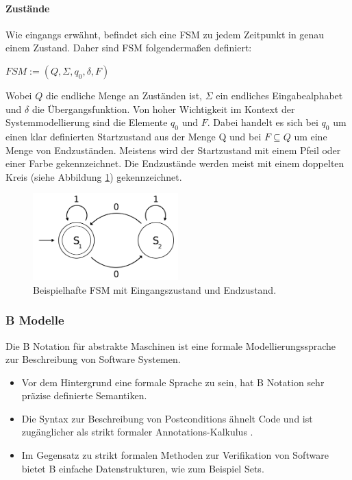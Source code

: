 \paragraph{Zustände}
Wie eingangs erwähnt, befindet sich eine \Gls{FSM} zu jedem Zeitpunkt in genau einem Zustand. Daher sind \Gls{FSM} folgendermaßen definiert: 

\begin{center}
$FSM := (Q, \Sigma, q_0, \delta, F)$
\end{center}

Wobei $Q$ die endliche Menge an Zuständen ist, $\Sigma$ ein endliches Eingabealphabet und $\delta$ die Übergangsfunktion. Von hoher Wichtigkeit im Kontext der Systemmodellierung sind die Elemente $q_0$ und $F$. Dabei handelt es sich bei $q_0$ um einen klar definierten Startzustand aus der Menge Q und bei $F \subseteq Q$ um eine Menge von Endzuständen. Meistens wird der Startzustand mit einem Pfeil oder einer Farbe gekennzeichnet. Die Endzustände werden meist mit einem doppelten Kreis (siehe Abbildung \ref{fig:fsm_example}) gekennzeichnet.

\begin{figure}[h] 
  \centering
     \includegraphics[width=0.5\textwidth]{figures/FSM_example.png}
  \caption{Beispielhafte FSM mit Eingangszustand und Endzustand.}
  \label{fig:fsm_example}
\end{figure}

\subsubsection{B Modelle}
Die B Notation für abstrakte Maschinen ist eine formale Modellierungssprache zur Beschreibung von Software Systemen.
\begin{itemize}
\item Vor dem Hintergrund eine formale Sprache zu sein, hat B Notation sehr präzise definierte Semantiken.
\item Die Syntax zur Beschreibung von Postconditions ähnelt Code und ist zugänglicher als strikt formaler Annotations-Kalkulus \cite{huth_logic_2004}.
\item Im Gegensatz zu strikt formalen Methoden zur Verifikation von Software bietet B einfache Datenstrukturen, wie zum Beispiel Sets.
\end{itemize}

